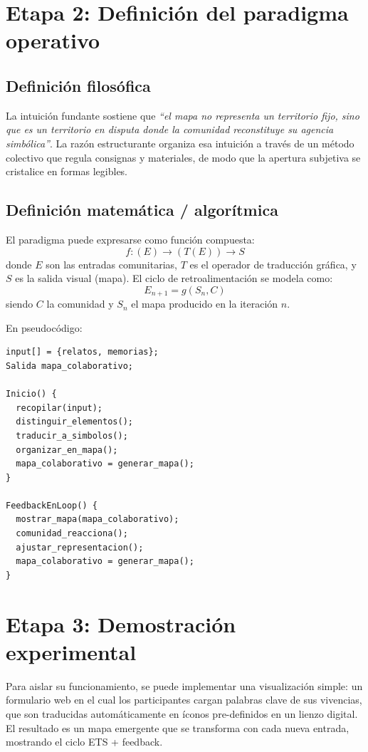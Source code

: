 \documentclass[spanish]{report}
\begin{document}
\section{Etapa 2: Definición del paradigma operativo}

\subsection{Definición filosófica}
La intuición fundante sostiene que \emph{“el mapa no representa un territorio fijo, sino que es un territorio en disputa donde la comunidad reconstituye su agencia simbólica”}.  
La razón estructurante organiza esa intuición a través de un método colectivo que regula consignas y materiales, de modo que la apertura subjetiva se cristalice en formas legibles.

\subsection{Definición matemática / algorítmica}
El paradigma puede expresarse como función compuesta:
\[
f: (E) \rightarrow (T(E)) \rightarrow S
\]
donde \(E\) son las entradas comunitarias, \(T\) es el operador de traducción gráfica, y \(S\) es la salida visual (mapa).  
El ciclo de retroalimentación se modela como:
\[
E_{n+1} = g(S_n, C)
\]
siendo \(C\) la comunidad y \(S_n\) el mapa producido en la iteración \(n\).

En pseudocódigo:

\begin{verbatim}
input[] = {relatos, memorias};
Salida mapa_colaborativo;

Inicio() {
  recopilar(input);
  distinguir_elementos();
  traducir_a_simbolos();
  organizar_en_mapa();
  mapa_colaborativo = generar_mapa();
}

FeedbackEnLoop() {
  mostrar_mapa(mapa_colaborativo);
  comunidad_reacciona();
  ajustar_representacion();
  mapa_colaborativo = generar_mapa();
}

\end{verbatim}

\section{Etapa 3: Demostración experimental}
Para aislar su funcionamiento, se puede implementar una visualización simple: 
un formulario web en el cual los participantes cargan palabras clave de sus vivencias, 
que son traducidas automáticamente en íconos pre-definidos en un lienzo digital. 
El resultado es un mapa emergente que se transforma con cada nueva entrada, mostrando el ciclo ETS + feedback.
\end{document}
